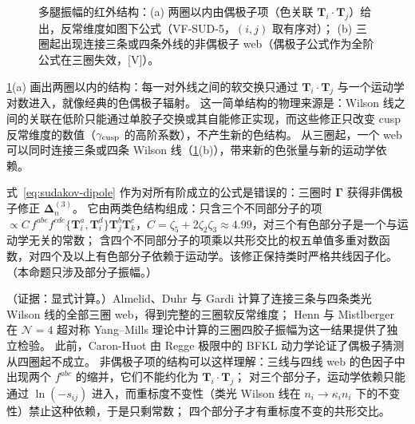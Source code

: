 \begin{figure}[htbp]
\caption{多腿振幅的红外结构：(a) 两圈以内由偶极子项（色关联 $\mathbf T_i\cdot\mathbf T_j$）给出，反常维度如图下公式（VF-SUD-5，$(i,j)$ 取有序对）；
(b) 三圈起出现连接三条或四条外线的非偶极子 web（偶极子公式作为全阶公式在三圈失效，[V]）。}
\label{fig:sudakov-dipole}
\end{figure}

\cref{fig:sudakov-dipole}(a) 画出两圈以内的结构：每一对外线之间的软交换只通过 $\mathbf T_i\cdot\mathbf T_j$ 与一个运动学对数进入，就像经典的色偶极子辐射。
这一简单结构的物理来源是：Wilson 线之间的关联在低阶只能通过单胶子交换或其自能修正实现，而这些修正只改变 cusp 反常维度的数值（$\gamma_{\rm cusp}$ 的高阶系数），不产生新的色结构。
从三圈起，一个 web 可以同时连接三条或四条 Wilson 线（\cref{fig:sudakov-dipole}(b)），带来新的色张量与新的运动学依赖。

\begin{proposition}\label{prop:sudakov-dipole-violation}
式~\eqref{eq:sudakov-dipole} 作为对所有阶成立的公式是错误的：三圈时 $\boldsymbol\Gamma$ 获得非偶极子修正 $\boldsymbol\Delta^{(3)}_n$。
它由两类色结构组成：只含三个不同部分子的项 $\propto C\,f^{abe}f^{cde}\{\mathbf T_i^a,\mathbf T_i^d\}\mathbf T_j^b\mathbf T_k^c$，$C=\zeta_5+2\zeta_2\zeta_3\approx4.99$，对三个有色部分子是一个与运动学无关的常数；
含四个不同部分子的项乘以共形交比的权五单值多重对数函数，对四个及以上有色部分子依赖于运动学。该修正保持类时严格共线因子化\cite[式~(7)、(13)、(14)、(17)]{Almelid:2015jia}。
（本命题只涉及部分子振幅。）
\end{proposition}

\begin{proofsketch}
（证据：显式计算。）Almelid、Duhr 与 Gardi 计算了连接三条与四条类光 Wilson 线的全部三圈 web，得到完整的三圈软反常维度\cite{Almelid:2015jia}；
Henn 与 Mistlberger 在 $\mathcal N=4$ 超对称 Yang--Mills 理论中计算的三圈四胶子振幅为这一结果提供了独立检验\cite{Henn:2016jdu}。
此前，Caron-Huot 由 Regge 极限中的 BFKL 动力学论证了偶极子猜测从四圈起不成立\cite[第~4.3~节，式~(4.28)]{Caron-Huot:2013fea}。
非偶极子项的结构可以这样理解：三线与四线 web 的色因子中出现两个 $f^{abc}$ 的缩并，它们不能约化为 $\mathbf T_i\cdot\mathbf T_j$；
对三个部分子，运动学依赖只能通过 $\ln(-s_{ij})$ 进入，而重标度不变性（类光 Wilson 线在 $n_i\to\kappa_in_i$ 下的不变性）禁止这种依赖，于是只剩常数；
四个部分子才有重标度不变的共形交比。
\end{proofsketch}

